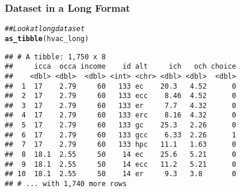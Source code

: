 \documentclass{beamer}\usepackage[]{graphicx}\usepackage[]{color}
\makeatletter
\newcommand{\hlnum}[1]{\textcolor[rgb]{0.686,0.059,0.569}{#1}}%
\newcommand{\hlstr}[1]{\textcolor[rgb]{0.192,0.494,0.8}{#1}}%
\newcommand{\hlcom}[1]{\textcolor[rgb]{0.678,0.584,0.686}{\textit{#1}}}%
\newcommand{\hlopt}[1]{\textcolor[rgb]{0,0,0}{#1}}%
\newcommand{\hlstd}[1]{\textcolor[rgb]{0.345,0.345,0.345}{#1}}%
\newcommand{\hlkwb}[1]{\textcolor[rgb]{0.69,0.353,0.396}{#1}}%
\newcommand{\hlkwc}[1]{\textcolor[rgb]{0.333,0.667,0.333}{#1}}%
\newcommand{\hlkwd}[1]{\textcolor[rgb]{0.737,0.353,0.396}{\textbf{#1}}}%
\newenvironment{kframe}{%
 \def\at@end@of@kframe{}%
 \ifinner\ifhmode%
  \def\at@end@of@kframe{\end{minipage}}%
  \begin{minipage}{\columnwidth}%
 \fi\fi%
 \def\FrameCommand##1{\hskip\@totalleftmargin \hskip-\fboxsep
 \colorbox{shadecolor}{##1}\hskip-\fboxsep
     \hskip-\linewidth \hskip-\@totalleftmargin \hskip\columnwidth}%
 \MakeFramed {\advance\hsize-\width
   \@totalleftmargin\z@ \linewidth\hsize
   \@setminipage}}%
 {\par\unskip\endMakeFramed%
 \at@end@of@kframe}
\newenvironment{knitrout}{}{} %
\makeatother
\begin{document}

\begin{frame}[fragile]\frametitle{Dataset in a Long Format}
\begin{knitrout}\footnotesize
{}\color{fgcolor}\begin{kframe}
\begin{alltt}
\hlcom{## Look at long dataset}
\hlkwd{as_tibble}\hlstd{(hvac_long)}
\end{alltt}
\begin{verbatim}
## # A tibble: 1,750 x 8
##     icca  occa income    id alt     ich   och choice
##    <dbl> <dbl>  <dbl> <int> <chr> <dbl> <dbl>  <dbl>
##  1  17    2.79     60   133 ec    20.3   4.52      0
##  2  17    2.79     60   133 ecc    8.46  4.52      0
##  3  17    2.79     60   133 er     7.7   4.32      0
##  4  17    2.79     60   133 erc    8.16  4.32      0
##  5  17    2.79     60   133 gc    25.3   2.26      0
##  6  17    2.79     60   133 gcc    6.33  2.26      1
##  7  17    2.79     60   133 hpc   11.1   1.63      0
##  8  18.1  2.55     50    14 ec    25.6   5.21      0
##  9  18.1  2.55     50    14 ecc   11.2   5.21      0
## 10  18.1  2.55     50    14 er     9.3   3.8       0
## # ... with 1,740 more rows
\end{verbatim}
\end{kframe}
\end{knitrout}
\end{frame}
\end{document}
